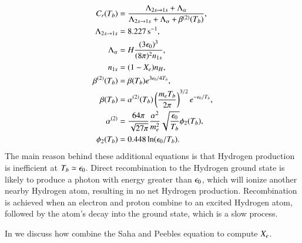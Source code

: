 \begin{subequations} \label{eq:M2:theory:peebles:ODE_all_individual_terms}
    \begin{align}
        C_r(T_b) &= \frac{\Lambda_{2s\to1s} + \Lambda_\alpha}{\Lambda_{2s\to1s} + \Lambda_\alpha + \beta^{(2)}(T_b)}, \label{eq:M2:theory:peebles:C_r} \\
        \Lambda_{2s\to1s} &= 8.227\,\mathrm{s^{-1}}, \label{eq:M2:theory:peebles:Lambda_2s_1s} \\
        \Lambda_\alpha &= H \frac{(3\epsilon_0)^3}{(8\pi)^2 n_{1s}}, \label{eq:M2:theory:peebles:Lambda_alpha} \\
        n_{1s} &= (1-X_e) n_H , \label{eq:M2:theory:peebles:n_1s} \\
        \beta^{(2)}(T_b) &= \beta(T_b) e^{3\epsilon_0/4T_b}, \label{eq:M2:theory:peebles:beta2} \\
        \beta(T_b) &= \alpha^{(2)}(T_b) \left( \frac{m_e T_b}{2\pi} \right)^{3/2} e^{-\epsilon_0/T_b}, \label{eq:M2:theory:peebles:beta} \\
        \alpha^{(2)} &= \frac{64\pi}{\sqrt{27\pi}} \frac{\alpha^2}{m_e^2} \sqrt{\frac{\epsilon_0}{T_b}} \phi_2(T_b), \label{eq:M2:theory:peebles:alpha_2} \\
        \phi_2(T_b) &= 0.448\ln(\epsilon_0/T_b). \label{eq:M2:theory:peebles:phi_2} 
    \end{align}
\end{subequations}
The main reason behind these additional equations is that Hydrogen production is inefficient at $T_b\simeq\epsilon_0$. Direct recombination to the Hydrogen ground state is likely to produce a photon with energy greater than $\epsilon_0$, which will ionize another nearby Hydrogen atom, resulting in no net Hydrogen production. Recombination is achieved when an electron and proton combine to an excited Hydrogen atom, followed by the atom's decay into the ground state, which is a slow process. 

In  we discuss how combine the Saha and Peebles equation to compute $X_e$.


